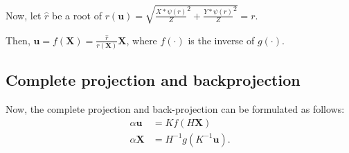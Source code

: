 Now, let \(\widehat{r}\) be a root of
\(r(\mathbf{u})
= \sqrt{
	\frac{X * \psi \left( r\right)}{Z}^{2} +
	\frac{Y * \psi \left( r\right)}{Z}^{2}
} = r\).

Then, \(\mathbf{u} = f(\mathbf{X}) =
\frac{\widehat{r}}{r(\mathbf{X})}\mathbf{X}\),
where \(f(\cdot)\) is the inverse of \(g(\cdot)\).

\subsection{Complete projection and backprojection}\label{sub:complete_projection_and_backprojection}

Now, the complete projection and back-projection can be formulated as follows:
\begin{align}
	\alpha \mathbf{u} & = K f(H\mathbf{X})
	\tag{Projection} \label{eq:projection}                     \\
	\alpha \mathbf{X} & = H^{-1} g(K^{-1}\mathbf{u}) \tag{Back
		projection} \label{eq:back_projection}.
\end{align}

